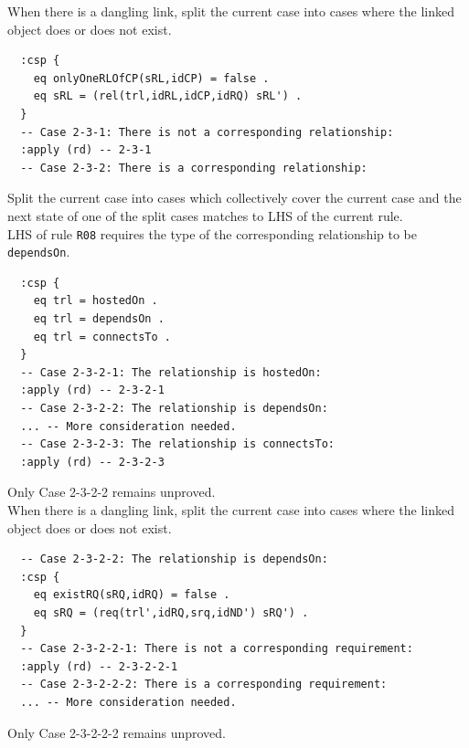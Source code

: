 \documentclass[12pt]{report}
\begin{document}
 When there is a dangling link, split the
current case into cases where the linked object does or does not
exist.
\small
\begin{verbatim}
  :csp {
    eq onlyOneRLOfCP(sRL,idCP) = false .
    eq sRL = (rel(trl,idRL,idCP,idRQ) sRL') .
  }
  -- Case 2-3-1: There is not a corresponding relationship:
  :apply (rd) -- 2-3-1
  -- Case 2-3-2: There is a corresponding relationship:
\end{verbatim}
\normalsize

 Split the current case into cases which
collectively cover the current case and the next state of one of the split cases
matches to LHS of the current rule. \\
LHS of rule {\tt R08} requires the type of the corresponding relationship
to be {\tt dependsOn}.
\small
\begin{verbatim}
  :csp {
    eq trl = hostedOn .
    eq trl = dependsOn .
    eq trl = connectsTo .
  }
  -- Case 2-3-2-1: The relationship is hostedOn:
  :apply (rd) -- 2-3-2-1
  -- Case 2-3-2-2: The relationship is dependsOn:
  ... -- More consideration needed.
  -- Case 2-3-2-3: The relationship is connectsTo:
  :apply (rd) -- 2-3-2-3
\end{verbatim}
\normalsize
Only Case 2-3-2-2 remains unproved.\\

 When there is a dangling link, split the
current case into cases where the linked object does or does not
exist.
\small
\begin{verbatim}
  -- Case 2-3-2-2: The relationship is dependsOn:
  :csp {
    eq existRQ(sRQ,idRQ) = false .
    eq sRQ = (req(trl',idRQ,srq,idND') sRQ') .
  }
  -- Case 2-3-2-2-1: There is not a corresponding requirement:
  :apply (rd) -- 2-3-2-2-1
  -- Case 2-3-2-2-2: There is a corresponding requirement:
  ... -- More consideration needed.
\end{verbatim}
\normalsize
Only Case 2-3-2-2-2 remains unproved.\\
\end{document}
